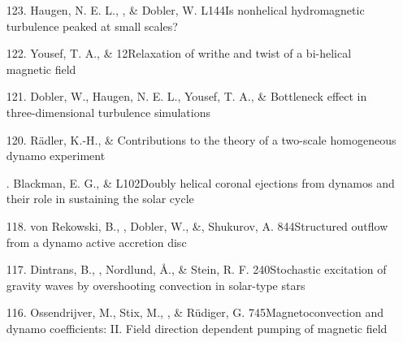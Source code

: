 \begin{itemize}
\item[123.]
Haugen, N. E. L., \Brandenburg, \& Dobler, W.
{L144}{Is nonhelical hydromagnetic turbulence peaked at small scales?}

\item[122.]
Yousef, T. A., \& \Brandenburg{}
{12}{Relaxation of writhe and twist of a bi-helical magnetic field}

\item[121.]
Dobler, W., Haugen, N. E. L., Yousef, T. A., \& \Brandenburg{}
{Bottleneck effect in three-dimensional turbulence simulations}

\item[120.]
R\"adler, K.-H., \& \Brandenburg{}
{Contributions to the theory of a two-scale homogeneous
dynamo experiment}

\item[\relevant 119.]
Blackman, E. G., \& \Brandenburg{}
{L102}{Doubly helical coronal ejections from dynamos
and their role in sustaining the solar cycle}

\item[118.]
von Rekowski, B., \Brandenburg, Dobler, W., \&,
Shukurov, A.
{844}{Structured outflow from a dynamo active accretion disc}

\item[117.]
Dintrans, B., \Brandenburg, Nordlund, \AA.,
\& Stein, R. F.
{240}{Stochastic excitation of gravity waves by overshooting
convection in solar-type stars}

\item[116.]
Ossendrijver, M., Stix, M., \Brandenburg, \&
R\"udiger, G.
{745}{Magnetoconvection and dynamo coefficients: II.
Field direction dependent pumping of magnetic field}


\end{itemize}
